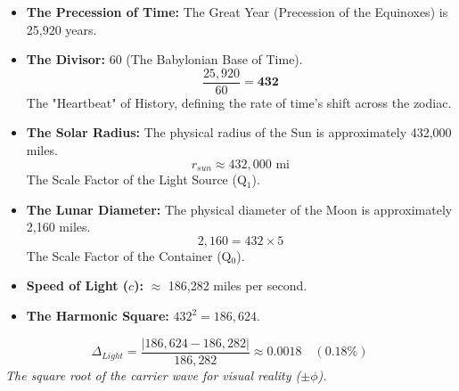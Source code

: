 \documentclass[12pt]{amsart}
\begin{document}
\begin{itemize}
    \item \textbf{The Precession of Time:} The Great Year (Precession of the Equinoxes) is 25,920 years.
    \item \textbf{The Divisor:} 60 (The Babylonian Base of Time).
    \begin{equation}
        \frac{25,920}{60} = \mathbf{432}
    \end{equation}
    The "Heartbeat" of History, defining the rate of time's shift across the zodiac.

    \item \textbf{The Solar Radius:} The physical radius of the Sun is approximately 432,000 miles.
    \begin{equation}
        r_{sun} \approx 432,000 \text{ mi}
    \end{equation}
    The Scale Factor of the Light Source (Q$_1$).

    \item \textbf{The Lunar Diameter:} The physical diameter of the Moon is approximately 2,160 miles.
    \begin{equation}
        2,160 = 432 \times 5
    \end{equation}
    The Scale Factor of the Container (Q$_0$).

    \item \textbf{Speed of Light ($c$):} $\approx$ 186,282 miles per second.
    \item \textbf{The Harmonic Square:} $432^2 = 186,624$.
\end{itemize}

\begin{equation}
    \Delta_{Light} = \frac{|186,624 - 186,282|}{186,282} \approx 0.0018 \quad (0.18\%)
\end{equation}
\textit{The square root of the carrier wave for visual reality ($\pm\phi$).}

\vspace{1em}
\begin{center}
\end{center}
\end{document}
